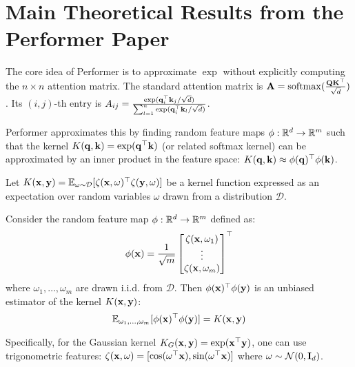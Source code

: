 \documentclass[aspectratio=169]{beamer}
\begin{document}
\section*{Main Theoretical Results from the Performer Paper}
\begin{frame}

	The core idea of Performer is to approximate $\exp$ without explicitly
	computing the $n \times n$ attention matrix. The standard attention matrix is
	$\mathbf{A} = \mathrm{softmax}(\frac{\mathbf{Q}\mathbf{K}^\top}{\sqrt{d}})$. Its $(i, j)$-th
	entry is $A_{ij} = \frac{\exp( \mathbf{q}_i^\top \mathbf{k}_j /
	\sqrt{d})}{\sum_{l=1}^n \exp( \mathbf{q}_i^\top \mathbf{k}_l / \sqrt{d})}$.

	Performer approximates this by finding random feature maps $\phi: \mathbb{R}^d \to
	\mathbb{R}^m$ such that the kernel $K(\mathbf{q}, \mathbf{k}) = \exp(\mathbf{q}^\top
	\mathbf{k})$ (or related softmax kernel) can be approximated by an inner product
	in the feature space: $K(\mathbf{q}, \mathbf{k}) \approx \phi(\mathbf{q})^\top
	\phi(\mathbf{k})$.
\end{frame}
\begin{frame}

	\begin{theorem} \label{thm:performer_kernel_approx}

		Let $K(\mathbf{x}, \mathbf{y}) = \mathbb{E}_{\omega \sim \mathcal{D}} [ \zeta(\mathbf{x},
		\omega)^\top \zeta(\mathbf{y}, \omega) ]$ be a kernel function expressed as
		an expectation over random variables $\omega$ drawn from a distribution
		$\mathcal{D}$.

		Consider the random feature map $\phi: \mathbb{R}^d \to \mathbb{R}^m$ defined as:
		$$ \phi(\mathbf{x}) = \frac{1}{\sqrt{m}} \begin{bmatrix} \zeta(\mathbf{x}, \omega_1) \\ \vdots \\ \zeta(\mathbf{x}, \omega_m) \end{bmatrix}^\top
		$$
		where $\omega_1, \dots, \omega_m$ are drawn i.i.d. from $\mathcal{D}$.
		Then $\phi(\mathbf{x})^\top \phi(\mathbf{y})$ is an unbiased estimator of the kernel $K(\mathbf{x}, \mathbf{y})$:
		$$
			\mathbb{E}_{\omega_1, \dots, \omega_m} [\phi(\mathbf{x})^\top \phi(\mathbf{y})] = K(\mathbf{x}, \mathbf{y})
		$$

	\end{theorem}

	Specifically, for the Gaussian kernel $K_G(\mathbf{x}, \mathbf{y}) =
	\exp(\mathbf{x}^\top \mathbf{y})$, one can use trigonometric features:
	$\zeta(\mathbf{x}, \omega) = [\cos(\omega^\top \mathbf{x}), \sin(\omega^\top
	\mathbf{x})]$ where $\omega \sim \mathcal{N}(0, \mathbf{I}_d)$.

\end{frame}
\end{document}
